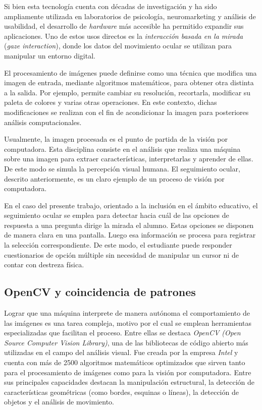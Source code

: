 Si bien esta tecnología cuenta con décadas de investigación y ha sido ampliamente utilizada en laboratorios de psicología, neuromarketing y análisis de usabilidad, el desarrollo de \emph{hardware} más accesible ha permitido expandir sus aplicaciones. Uno de estos usos directos es la \emph{interacción basada en la mirada} (\emph{gaze interaction}), donde los datos del movimiento ocular se utilizan para manipular un entorno digital.

El procesamiento de imágenes puede definirse como una técnica que modifica una imagen de entrada, mediante algoritmos matemáticos, para obtener otra distinta a la salida. Por ejemplo, permite cambiar su resolución, recortarla, modificar su paleta de colores y varias otras operaciones. En este contexto, dichas modificaciones se realizan con el fin de acondicionar la imagen para posteriores análisis computacionales.

Usualmente, la imagen procesada es el punto de partida de la visión por computadora. Esta disciplina consiste en el análisis que realiza una máquina sobre una imagen para extraer características, interpretarlas y aprender de ellas. De este modo se simula la percepción visual humana. El seguimiento ocular, descrito anteriormente, es un claro ejemplo de un proceso de visión por computadora.

En el caso del presente trabajo, orientado a la inclusión en el ámbito educativo, el seguimiento ocular se emplea para detectar hacia cuál de las opciones de respuesta a una pregunta dirige la mirada el alumno. Estas opciones se disponen de manera clara en una pantalla. Luego esa información se procesa para registrar la selección correspondiente. De este modo, el estudiante puede responder cuestionarios de opción múltiple sin necesidad de manipular un cursor ni de contar con destreza física.

\subsection{OpenCV y coincidencia de patrones}

Lograr que una máquina interprete de manera autónoma el comportamiento de las imágenes es una tarea compleja, motivo por el cual se emplean herramientas especializadas que facilitan el proceso. Entre ellas se destaca \emph{OpenCV (Open Source Computer Vision Library)}, una de las bibliotecas de código abierto más utilizadas en el campo del análisis visual. Fue creada por la empresa \emph{Intel} y cuenta con más de 2500 algoritmos matemáticos optimizados que sirven tanto para el procesamiento de imágenes como para la visión por computadora. Entre sus principales capacidades destacan la manipulación estructural, la detección de características geométricas (como bordes, esquinas o líneas), la detección de objetos y el análisis de movimiento.

